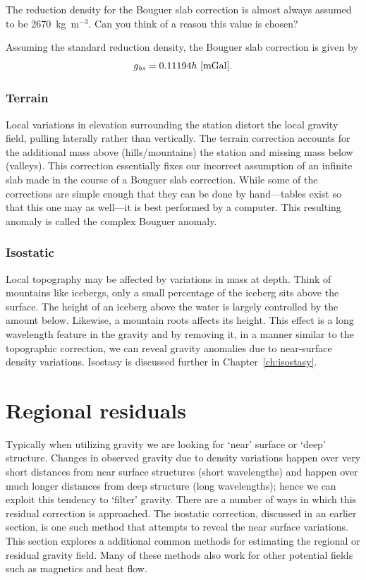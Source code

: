 The reduction density for the Bouguer slab correction is almost always assumed to be 2670~kg~m$^{-3}$.  Can you think of a reason this value is chosen?

Assuming the standard reduction density, the Bouguer slab correction is given by
\begin{equation}
    g_{\mathrm{\it bs}} = 0.11194 h \mbox{ $[$mGal$]$}.
\end{equation}

\subsubsection{Terrain}
Local variations in elevation surrounding the station distort the local gravity field, pulling laterally rather than vertically.  The terrain correction accounts for the additional mass above (hills/mountains) the station and missing mass below (valleys).  This correction essentially fixes our incorrect assumption of an infinite slab made in the course of a Bouguer slab correction.  While some of the corrections are simple enough that they can be done by hand---tables exist so that this one may as well---it is best performed by a computer.  This resulting anomaly is called the complex Bouguer anomaly.

\subsubsection{Isostatic}
Local topography may be affected by variations in mass at depth.  Think of mountains like icebergs, only a small percentage of the iceberg sits above the surface.  The height of an iceberg above the water is largely controlled by the amount below.  Likewise, a mountain roots affects its height.  This effect is a long wavelength feature in the gravity and by removing it, in a manner similar to the topographic correction, we can reveal gravity anomalies due to near-surface density variations. Isostasy is discussed further in Chapter~\ref{ch:isostasy}.


\section{Regional residuals}
Typically when utilizing gravity we are looking for `near' surface or `deep' structure.  Changes in observed gravity due to density variations happen over very short distances from near surface structures (short wavelengths) and happen over much longer distances from deep structure (long wavelengths); hence we can exploit this tendency to `filter' gravity.  There are a number of ways in which this residual correction is approached.  The isostatic correction, discussed in an earlier section, is one such method that attempts to reveal the near surface variations.  This section explores a additional common methods for estimating the regional or residual gravity field.  Many of these methods also work for other potential fields such as magnetics and heat flow.


